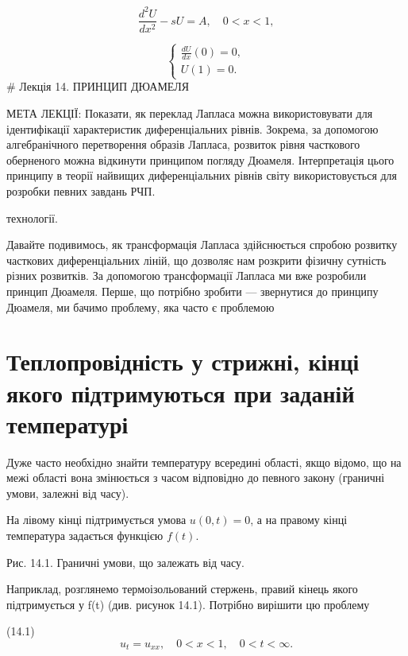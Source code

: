 \documentclass[
  ukrainian,
]{article}
\begin{document}
\[
\frac{d^2U}{dx^2} - sU = A, \quad 0 < x < 1,
\]

\[
\begin{cases}
\frac{dU}{dx}(0) = 0, \\
U(1) = 0.
\end{cases}
\] \# Лекція 14. ПРИНЦИП ДЮАМЕЛЯ

МЕТА ЛЕКЦІЇ: Показати, як переклад Лапласа можна використовувати для
ідентифікації характеристик диференціальних рівнів. Зокрема, за
допомогою алгебранічного перетворення образів Лапласа, розвиток рівня
часткового оберненого можна відкинути принципом погляду Дюамеля.
Інтерпретація цього принципу в теорії найвищих диференціальних рівнів
світу використовується для розробки певних завдань РЧП.

технології.

Давайте подивимось, як трансформація Лапласа здійснюється спробою
розвитку часткових диференціальних ліній, що дозволяє нам розкрити
фізичну сутність різних розвитків. За допомогою трансформації Лапласа ми
вже розробили принцип Дюамеля. Перше, що потрібно зробити --- звернутися
до принципу Дюамеля, ми бачимо проблему, яка часто є проблемою

\section{Теплопровідність у стрижні, кінці якого підтримуються при
заданій
температурі}\label{ux442ux435ux43fux43bux43eux43fux440ux43eux432ux456ux434ux43dux456ux441ux442ux44c-ux443-ux441ux442ux440ux438ux436ux43dux456-ux43aux456ux43dux446ux456-ux44fux43aux43eux433ux43e-ux43fux456ux434ux442ux440ux438ux43cux443ux44eux442ux44cux441ux44f-ux43fux440ux438-ux437ux430ux434ux430ux43dux456ux439-ux442ux435ux43cux43fux435ux440ux430ux442ux443ux440ux456}

Дуже часто необхідно знайти температуру всередині області, якщо відомо,
що на межі області вона змінюється з часом відповідно до певного закону
(граничні умови, залежні від часу).

На лівому кінці підтримується умова \(u(0,t)=0\), а на правому кінці
температура задається функцією \(f(t)\).

Рис. 14.1. Граничні умови, що залежать від часу.

Наприклад, розглянемо термоізольований стержень, правий кінець якого
підтримується у f(t) (див. рисунок 14.1). Потрібно вирішити цю проблему

(14.1) \[
u_t = u_{xx}, \quad 0 < x < 1, \quad 0 < t < \infty.
\]
\end{document}
